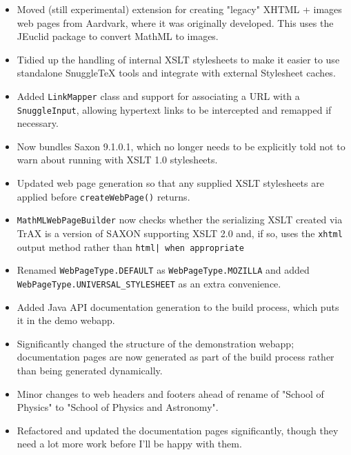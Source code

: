 \begin{itemize}
  \item Moved (still experimental) extension for creating "legacy" XHTML +
  images web pages from Aardvark, where it was originally developed. This uses
  the JEuclid package to convert MathML to images.

  \item Tidied up the handling of internal XSLT stylesheets to make it easier
  to use standalone SnuggleTeX tools and integrate with external Stylesheet
  caches.

  \item Added \verb|LinkMapper| class and support for associating a URL with a
  \verb|SnuggleInput|, allowing hypertext links to be intercepted and remapped
  if necessary.

  \item Now bundles Saxon 9.1.0.1, which no longer needs to be explicitly told
  not to warn about running with XSLT 1.0 stylesheets.

  \item Updated web page generation so that any supplied XSLT stylesheets are
  applied before \verb|createWebPage()| returns.

  \item \verb|MathMLWebPageBuilder| now checks whether the serializing XSLT
  created via TrAX is a version of SAXON supporting XSLT 2.0 and, if so,
  uses the \verb|xhtml| output method rather than \verb.html| when appropriate.

  \item Renamed \verb|WebPageType.DEFAULT| as \verb|WebPageType.MOZILLA| and
  added \verb|WebPageType.UNIVERSAL_STYLESHEET| as an extra convenience.

  \item Added Java API documentation generation to the build process, which
  puts it in the demo webapp.

  \item Significantly changed the structure of the demonstration webapp;
  documentation pages are now generated as part of the build process rather
  than being generated dynamically.

  \item Minor changes to web headers and footers ahead of rename of "School of
  Physics" to "School of Physics and Astronomy".

  \item Refactored and updated the documentation pages significantly, though
  they need a lot more work before I'll be happy with them.


\end{itemize}
